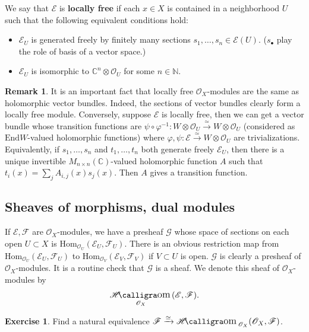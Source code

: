 \documentclass[12pt,a4paper,notitlepage]{article}
\theoremstyle{definition}
\newtheorem{exe}[df]{Exercise}
\newtheorem{rem}[df]{Remark}
\theoremstyle{plain}
\DeclareMathOperator{\shom}{\mathscr{H}\text{\kern -3pt {\calligra\large om}}\,}
\newcommand{\End}{\mathrm{End}} %
\newcommand{\Hom}{\mathrm{Hom}}
\newcommand{\scr}{\mathscr}
\newcommand{\blt}{\bullet}
\newcommand{\Cbb}{\mathbb C}
\newcommand{\Nbb}{\mathbb N}
\numberwithin{equation}{section}
\begin{document}
We say that $\scr E$ is \textbf{locally free} if each $x\in X$ is contained in a neighborhood $U$ such that the following equivalent conditions hold:
\begin{itemize}
	\item $\scr E_U$ is generated freely by finitely many sections $s_1,\dots,s_n\in\scr E(U)$. ($s_\blt$ play the role of basis of a vector space.)
	\item $\scr E_U$ is isomorphic to $\Cbb^n\otimes\scr O_U$ for some $n\in\Nbb$. 
\end{itemize}








\begin{rem}\label{lb105}
	It is an important fact that locally free $\scr O_X$-modules are the same as holomorphic vector bundles. Indeed, the sections of vector bundles clearly form a locally free module. Conversely, suppose $\scr E$ is locally free, then we can get a vector bundle whose transition functions are $\psi\circ\varphi^{-1}:W\otimes\scr O_U\xrightarrow{\simeq}W\otimes\scr O_U$ (considered as $\End W$-valued holomorphic functions) where $\varphi,\psi:\scr E\xrightarrow{\simeq} W\otimes\scr O_U$ are trivializations. Equivalently, if $s_1,\dots,s_n$ and $t_1,\dots,t_n$ both generate freely $\scr E_U$, then there is a unique invertible $M_{n\times n}(\Cbb)$-valued holomorphic function $A$ such that $t_i(x)=\sum_j A_{i,j}(x)s_j(x)$. Then $A$ gives a transition function.
\end{rem}


\subsection{Sheaves of morphisms, dual modules}


If $\scr E,\scr F$ are $\scr O_X$-modules, we have a presheaf $\scr G$ whose space of sections on each open $U\subset X$ is $\Hom_{\scr O_U}(\scr E_U,\scr F_U)$. There is an obvious restriction map from $\Hom_{\scr O_U}(\scr E_U,\scr F_U)$ to $\Hom_{\scr O_V}(\scr E_V,\scr F_V)$ if $V\subset U$ is open. $\scr G$ is clearly a presheaf of $\scr O_X$-modules. It is a routine check that $\scr G$ is a sheaf. We denote this sheaf of $\scr O_X$-modules by
\begin{align*}
	\shom_{\scr O_X}(\scr E,\scr F).	
\end{align*}

\begin{exe}
	Find a natural equivalence $\scr F\xrightarrow{\simeq}\shom_{\scr O_X}(\scr O_X,\scr F)$.
\end{exe}
\end{document}
